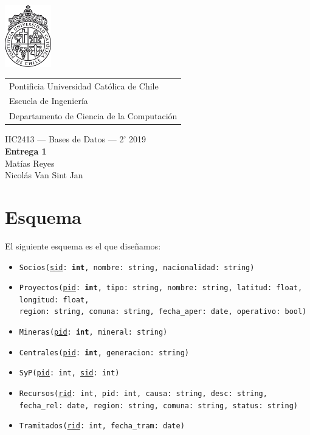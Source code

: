 \documentclass{article}
\begin{document}
\includegraphics[width=2cm]{uc.png}
\vspace*{-1.9cm}

\hspace*{2.1cm}
 \begin{tabular}{l}
  \sc Pontificia Universidad Católica de Chile \\
  \sc Escuela de Ingeniería \\
  \sc Departamento de Ciencia de la Computación
 \end{tabular}
 \bigskip

\vspace*{5mm}
\begin{center}
{IIC2413 --- Bases de Datos --- 2' 2019} \\
\vspace{3mm}
{\Large\bf Entrega 1} \\
\vspace{2mm}
Matías Reyes \\
Nicolás Van Sint Jan
\end{center}

\section{Esquema}

El siguiente esquema es el que diseñamos: 

	\begin{itemize}
		\item \texttt{Socios(\underline{sid}: \textbf{int}, nombre: string, nacionalidad: string)} 
		\item \texttt{Proyectos(\underline{pid}: \textbf{int}, tipo: string, nombre: string, latitud: float, longitud: float, \\ region: string, comuna: string, fecha\_aper: date, operativo: bool)} 
		\item \texttt{Mineras(\underline{pid}: \textbf{int}, mineral: string)} 
		\item \texttt{Centrales(\underline{pid}: \textbf{int}, generacion: string)} 
		\item \texttt{SyP(\underline{pid}: int, \underline{sid}: int)} 
		\item \texttt{Recursos(\underline{rid}: int, pid: int, causa: string, desc: string, fecha\_rel: date, region: string, comuna: string, status: string)} 
		\item \texttt{Tramitados(\underline{rid}: int, fecha\_tram: date)} 
	\end{itemize}
\end{document}
